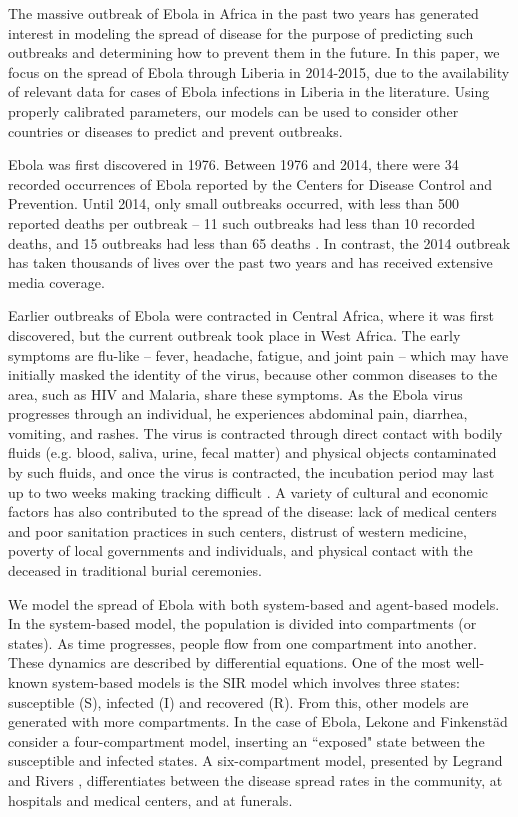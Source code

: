 The massive outbreak of Ebola in Africa in the past two years has generated interest in modeling the spread of disease for the purpose of predicting such outbreaks and determining how to prevent them in the future. In this paper, we focus on the spread of Ebola through Liberia in 2014-2015, due to the availability of relevant data for cases of Ebola infections in Liberia in the literature. Using properly calibrated parameters, our models can be used to consider other countries or diseases to predict and prevent outbreaks.

Ebola was first discovered in 1976. Between 1976 and 2014, there were 34 recorded occurrences of Ebola reported by the Centers for Disease Control and Prevention. Until 2014, only small outbreaks occurred, with less than 500 reported deaths per outbreak -- 11 such outbreaks had less than 10 recorded deaths, and 15 outbreaks had less than 65 deaths \cite{CDCOutbreaks}. In contrast, the 2014 outbreak has taken thousands of lives over the past two years and has received extensive media coverage.

Earlier outbreaks of Ebola were contracted in Central Africa, where it was first discovered, but the current outbreak took place in West Africa. The early symptoms are flu-like -- fever, headache, fatigue, and joint pain -- which may have initially masked the identity of the virus, because other common diseases to the area, such as HIV and Malaria, share these symptoms. As the Ebola virus progresses through an individual, he experiences abdominal pain, diarrhea, vomiting, and rashes. The virus is contracted through direct contact with bodily fluids (e.g. blood, saliva, urine, fecal matter) and physical objects contaminated by such fluids, and once the virus is contracted, the incubation period may last up to two weeks making tracking difficult \cite{CDCSympt}. A variety of cultural and economic factors has also contributed to the spread of the disease: lack of medical centers and poor sanitation practices in such centers, distrust of western medicine, poverty of local governments and individuals, and physical contact with the deceased in traditional burial ceremonies\cite{WHOReasons}.

We model the spread of Ebola with both system-based and agent-based models. In the system-based model, the population is divided into compartments (or states). As time progresses, people flow from one compartment into another. These dynamics are described by differential equations. One of the most well-known system-based models is the SIR model which involves three states: susceptible (S), infected (I) and recovered (R). From this, other models are generated with more compartments. In the case of Ebola, Lekone and Finkenstäd \cite{Lekone2006} consider a four-compartment model, inserting an ``exposed" state between the susceptible and infected states. A six-compartment model, presented by Legrand \cite{Legrand2007} and Rivers \cite{Rivers2014}, differentiates between the disease spread rates in the community, at hospitals and medical centers, and at funerals.

